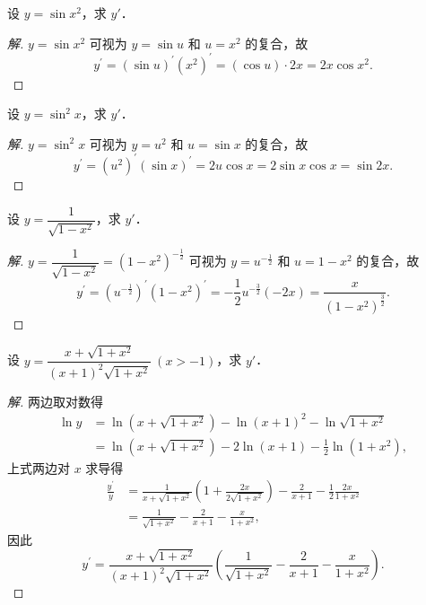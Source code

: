 \begin{example}\label{ex:4-1-7}
设 $y = \sin x^2$，求 $y'$．
\end{example}

\begin{proof}[解]
$y = \sin x^2$ 可视为 $y = \sin u$ 和 $u = x^2$ 的复合，故
\[
y^{\prime} = \left(\sin u\right)^{\prime}\left(x^{2}\right)^{\prime} = (\cos u)\cdot 2x = 2x\cos x^{2}.
\]
\end{proof}

\begin{example}\label{ex:4-1-8}
设 $y = \sin^2 x$，求 $y'$．
\end{example}

\begin{proof}[解]
$y = \sin^2 x$ 可视为 $y = u^2$ 和 $u = \sin x$ 的复合，故
\[
y^{\prime} = \left(u^{2}\right)^{\prime}(\sin x)^{\prime} = 2u\cos x = 2\sin x\cos x = \sin 2x.
\]
\end{proof}

\begin{example}\label{ex:4-1-9}
设 $y = \dfrac{1}{\sqrt{1 - x^{2}}}$，求 $y'$．
\end{example}

\begin{proof}[解]
$y = \dfrac{1}{\sqrt{1 - x^{2}}} = \left(1 - x^{2}\right)^{-\frac{1}{2}}$ 可视为 $y = u^{-\frac{1}{2}}$ 和 $u = 1 - x^2$ 的复合，故
\[
y^{\prime} = \left(u^{-\frac{1}{2}}\right)^{\prime}\left(1 - x^{2}\right)^{\prime} = -\frac{1}{2}u^{-\frac{3}{2}}\left(-2x\right) = \frac{x}{\left(1 - x^{2}\right)^{\frac{3}{2}}}.
\]
\end{proof}

\begin{example}\label{ex:4-1-10}
设 $y = \dfrac{x + \sqrt{1 + x^{2}}}{(x + 1)^{2} \sqrt{1 + x^{2}}}\ (x > -1)$，求 $y'$．
\end{example}

\begin{proof}[解]
两边取对数得
\[
\begin{aligned}
\ln y &= \ln\left(x+\sqrt{1+x^{2}}\right) - \ln\left(x+1\right)^{2} - \ln\sqrt{1+x^{2}}\\
&= \ln\left(x+\sqrt{1+x^{2}}\right) - 2\ln\left(x+1\right) - \frac{1}{2}\ln\left(1+x^{2}\right),
\end{aligned}
\]
上式两边对 $x$ 求导得
\[
\begin{aligned}
\frac{y^{\prime}}{y} &= \frac{1}{x+\sqrt{1+x^{2}}}\left(1+\frac{2x}{2\sqrt{1+x^{2}}}\right) - \frac{2}{x+1} - \frac{1}{2}\frac{2x}{1+x^{2}}\\
&= \frac{1}{\sqrt{1+x^{2}}} - \frac{2}{x+1} - \frac{x}{1+x^{2}},
\end{aligned}
\]
因此
\[
y^{\prime} = \frac{x+\sqrt{1+x^{2}}}{(x+1)^{2}\sqrt{1+x^{2}}}\left(\frac{1}{\sqrt{1+x^{2}}} - \frac{2}{x+1} - \frac{x}{1+x^{2}}\right).
\]
\end{proof}

